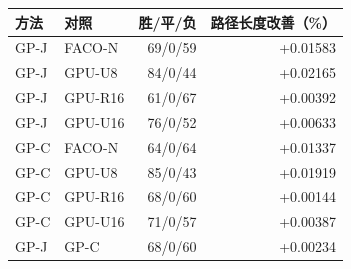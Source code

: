 \begin{tabular}{@{}llrr@{}}
\toprule
方法 & 对照 & 胜/平/负 & 路径长度改善（\%） \\ \midrule
GP-J & FACO-N & 69/0/59 & +0.01583 \\
GP-J & GPU-U8 & 84/0/44 & +0.02165 \\
GP-J & GPU-R16 & 61/0/67 & +0.00392 \\
GP-J & GPU-U16 & 76/0/52 & +0.00633 \\
GP-C & FACO-N & 64/0/64 & +0.01337 \\
GP-C & GPU-U8 & 85/0/43 & +0.01919 \\
GP-C & GPU-R16 & 68/0/60 & +0.00144 \\
GP-C & GPU-U16 & 71/0/57 & +0.00387 \\
GP-J & GP-C & 68/0/60 & +0.00234 \\
\bottomrule
\end{tabular}

